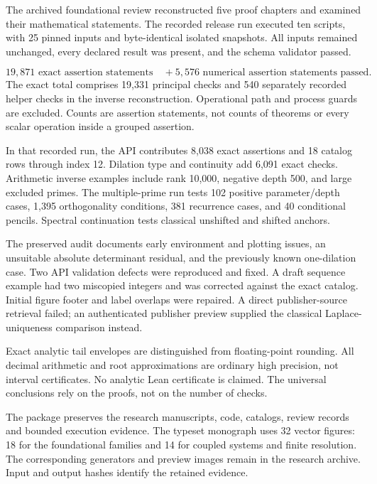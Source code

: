 The archived foundational review reconstructed five proof chapters and examined
their mathematical statements. The recorded release run executed ten scripts, with
25 pinned inputs and byte-identical isolated snapshots. All inputs remained
unchanged, every declared result was present, and the schema validator passed.

\[
\boxed{19{,}871\text{ exact assertion statements}\quad+
5{,}576\text{ numerical assertion statements passed}.}
\]
The exact total comprises 19,331 principal checks and 540 separately recorded
helper checks in the inverse reconstruction. Operational path and process
guards are excluded. Counts are assertion statements, not counts of theorems
or every scalar operation inside a grouped assertion.

In that recorded run, the API contributes 8,038 exact assertions and 18 catalog rows through index
12. Dilation type and continuity add 6,091 exact checks. Arithmetic inverse
examples include rank 10,000, negative depth 500, and large excluded primes.
The multiple-prime run tests 102 positive parameter/depth cases, 1,395
orthogonality conditions, 381 recurrence cases, and 40 conditional pencils.
Spectral continuation tests classical unshifted and shifted anchors.

The preserved audit documents early environment and plotting issues, an unsuitable absolute determinant residual, and the previously known one-dilation case.
Two API validation defects were reproduced and fixed. A draft
sequence example had two miscopied integers and was corrected against the
exact catalog. Initial figure footer and label overlaps were repaired.
A direct publisher-source retrieval failed; an authenticated publisher
preview supplied the classical Laplace-uniqueness comparison instead.

Exact analytic tail envelopes are distinguished from floating-point rounding.
All decimal arithmetic and root approximations are ordinary high precision,
not interval certificates. No analytic Lean certificate is claimed.
The universal conclusions rely on the proofs, not on the number of checks.

The package preserves the research manuscripts, code, catalogs, review records
and bounded execution evidence. The typeset monograph uses 32 vector figures:
18 for the foundational families and 14 for coupled systems and finite
resolution. The corresponding generators and preview images remain in the
research archive. Input and output hashes identify the retained evidence.

